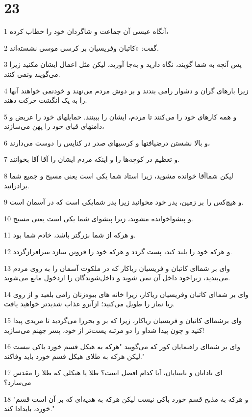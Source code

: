\chapter{23}

\par 1 آنگاه عیسی آن جماعت و شاگردان خود را خطاب کرده،
\par 2 گفت: «کاتبان وفریسیان بر کرسی موسی نشسته‌اند.
\par 3 پس آنچه به شما گویند، نگاه دارید و به‌جا آورید، لیکن مثل اعمال ایشان مکنید زیرا می‌گویند ونمی کنند.
\par 4 زیرا بارهای گران و دشوار رامی بندند و بر دوش مردم می‌نهند و خودنمی خواهند آنها را به یک انگشت حرکت دهند.
\par 5 و همه کارهای خود را می‌کنند تا مردم، ایشان را ببینند. حمایلهای خود را عریض و دامنهای قبای خود را پهن می‌سازند،
\par 6 و بالا نشستن درضیافتها و کرسیهای صدر در کنایس را دوست می‌دارند،
\par 7 و تعظیم در کوچه‌ها را و اینکه مردم ایشان را آقا آقا بخوانند.
\par 8 لیکن شماآقا خوانده مشوید، زیرا استاد شما یکی است یعنی مسیح و جمیع شما برادرانید.
\par 9 و هیچ‌کس را بر زمین، پدر خود مخوانید زیرا پدر شمایکی است که در آسمان است.
\par 10 و پیشواخوانده مشوید، زیرا پیشوای شما یکی است یعنی مسیح.
\par 11 و هر‌که از شما بزرگتر باشد، خادم شما بود.
\par 12 و هر‌که خود را بلند کند، پست گردد و هر‌که خود را فروتن سازد سرافرازگردد.
\par 13 وای بر شما‌ای کاتبان و فریسیان ریاکار که در ملکوت آسمان را به روی مردم می‌بندید، زیراخود داخل آن نمی شوید و داخل‌شوندگان را ازدخول مانع می‌شوید.
\par 14 وای بر شما‌ای کاتبان وفریسیان ریاکار، زیرا خانه های بیوه‌زنان رامی بلعید و از روی ریا نماز را طویل می‌کنید؛ ازآنرو عذاب شدیدتر خواهید یافت.
\par 15 وای برشما‌ای کاتبان و فریسیان ریاکار، زیرا که بر و بحررا می‌گردید تا مریدی پیدا کنید و چون پیدا شداو را دو مرتبه پست‌تر از خود، پسر جهنم می‌سازید!
\par 16 وای بر شما‌ای راهنمایان کور که می‌گویید "هر‌که به هیکل قسم خورد باکی نیست لیکن هر‌که به طلای هیکل قسم خورد باید وفاکند."
\par 17 ‌ای نادانان و نابینایان، آیا کدام افضل است؟ طلا یا هیکلی که طلا را مقدس می‌سازد؟
\par 18 "و هر‌که به مذبح قسم خورد باکی نیست لیکن هر‌که به هدیه‌ای که بر آن است قسم خورد، بایدادا کند."
